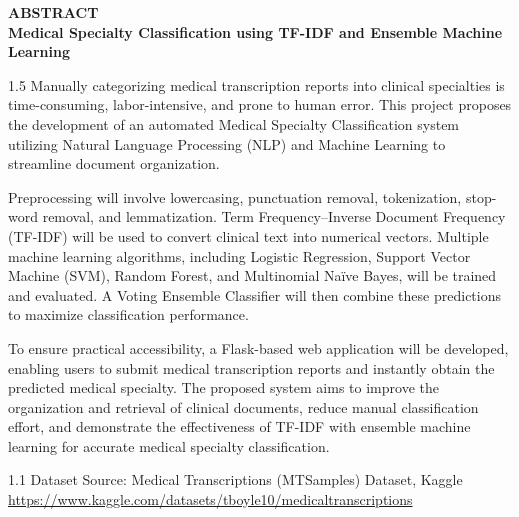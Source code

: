 \documentclass[12pt, a4paper]{article}
\begin{document}
\thispagestyle{empty} %

\begin{center}
    \textbf{\fontsize{16pt}{19.2pt}\selectfont ABSTRACT} \\[4pt]
    \textbf{\fontsize{14pt}{16.8pt}\selectfont Medical Specialty Classification using TF-IDF and Ensemble Machine Learning}
\end{center}

\begin{spacing}{1.5}
Manually categorizing medical transcription reports into clinical specialties is time-consuming, labor-intensive, and prone to human error. This project proposes the development of an automated Medical Specialty Classification system utilizing Natural Language Processing (NLP) and Machine Learning to streamline document organization.

Preprocessing will involve lowercasing, punctuation removal, tokenization, stop-word removal, and lemmatization. Term Frequency--Inverse Document Frequency (TF-IDF) will be used to convert clinical text into numerical vectors. Multiple machine learning algorithms, including Logistic Regression, Support Vector Machine (SVM), Random Forest, and Multinomial Naïve Bayes, will be trained and evaluated. A Voting Ensemble Classifier will then combine these predictions to maximize classification performance.

To ensure practical accessibility, a Flask-based web application will be developed, enabling users to submit medical transcription reports and instantly obtain the predicted medical specialty. The proposed system aims to improve the organization and retrieval of clinical documents, reduce manual classification effort, and demonstrate the effectiveness of TF-IDF with ensemble machine learning for accurate medical specialty classification.
\end{spacing}

\vspace{6pt}
\begin{spacing}{1.1}
\noindent Dataset Source: Medical Transcriptions (MTSamples) Dataset, Kaggle \\
\url{https://www.kaggle.com/datasets/tboyle10/medicaltranscriptions}
\end{spacing}
\end{document}
